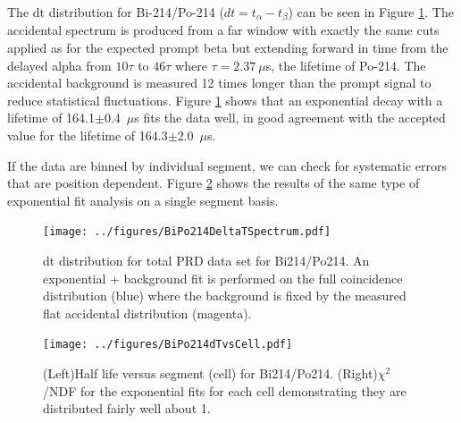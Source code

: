The dt distribution for Bi-214/Po-214 ($dt=t_{\alpha}-t_{\beta}$) can be seen in Figure \ref{fig:Po214dtcum}. The accidental spectrum is produced from a far window with exactly the same cuts applied as for the expected prompt beta but extending forward in time from the delayed alpha from $10\tau$ to $46\tau$ where $\tau=2.37~\mu$s, the lifetime of Po-214. The accidental background is measured 12 times longer than the prompt signal to reduce statistical fluctuations. Figure \ref{fig:Po214dtcum} shows that an exponential decay with a lifetime of 164.1$\pm$0.4~$\mu$s fits the data well, in good agreement with the accepted value for the lifetime of 164.3$\pm$2.0~$\mu$s. 

If the data are binned by individual segment, we can check for systematic errors that are position dependent. Figure \ref{fig:Po214thalfvscell} shows the results of the same type of exponential fit analysis on a single segment basis.  
\begin{figure}[!h]
\centering
\texttt{[image: ../figures/BiPo214DeltaTSpectrum.pdf]}
\caption{\label{fig:Po214dtcum}dt distribution for total PRD data set for Bi214/Po214. An exponential + background fit is performed on the full coincidence distribution (blue) where the background is fixed by the measured flat accidental distribution (magenta). }
\end{figure}

\begin{figure}[!h]
\centering
\texttt{[image: ../figures/BiPo214dTvsCell.pdf]}
\caption{\label{fig:Po214thalfvscell}(Left)Half life versus segment (cell) for Bi214/Po214. (Right)$\chi^2$/NDF for the exponential fits for each cell demonstrating they are distributed fairly well about 1.}
\end{figure}

